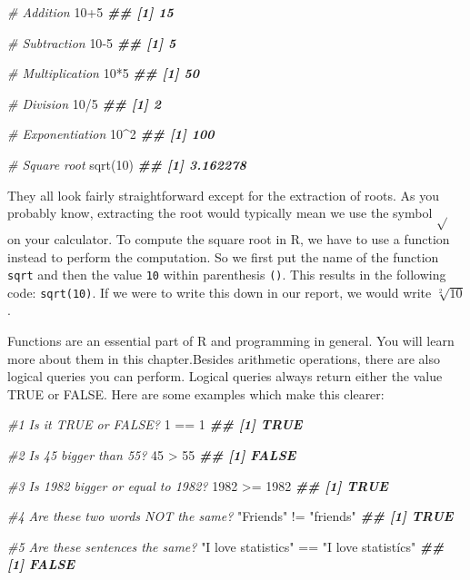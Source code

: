 \documentclass[
]{book}
\newenvironment{Shaded}{\begin{snugshade}}{\end{snugshade}}
\newcommand{\CommentTok}[1]{\textcolor[rgb]{0.56,0.35,0.01}{\textit{#1}}}
\newcommand{\DecValTok}[1]{\textcolor[rgb]{0.00,0.00,0.81}{#1}}
\newcommand{\DocumentationTok}[1]{\textcolor[rgb]{0.56,0.35,0.01}{\textbf{\textit{#1}}}}
\newcommand{\FunctionTok}[1]{\textcolor[rgb]{0.00,0.00,0.00}{#1}}
\newcommand{\NormalTok}[1]{#1}
\newcommand{\SpecialCharTok}[1]{\textcolor[rgb]{0.00,0.00,0.00}{#1}}
\newcommand{\StringTok}[1]{\textcolor[rgb]{0.31,0.60,0.02}{#1}}
\begin{document}
\begin{Shaded}
\begin{Highlighting}[]
\CommentTok{\# Addition}
\DecValTok{10}\SpecialCharTok{+}\DecValTok{5}
\DocumentationTok{\#\# [1] 15}

\CommentTok{\# Subtraction}
\DecValTok{10{-}5}
\DocumentationTok{\#\# [1] 5}

\CommentTok{\# Multiplication}
\DecValTok{10}\SpecialCharTok{*}\DecValTok{5}
\DocumentationTok{\#\# [1] 50}

\CommentTok{\# Division}
\DecValTok{10}\SpecialCharTok{/}\DecValTok{5}
\DocumentationTok{\#\# [1] 2}

\CommentTok{\# Exponentiation}
\DecValTok{10}\SpecialCharTok{\^{}}\DecValTok{2}
\DocumentationTok{\#\# [1] 100}

\CommentTok{\# Square root}
\FunctionTok{sqrt}\NormalTok{(}\DecValTok{10}\NormalTok{)}
\DocumentationTok{\#\# [1] 3.162278}
\end{Highlighting}
\end{Shaded}

They all look fairly straightforward except for the extraction of roots. As you probably know, extracting the root would typically mean we use the symbol \(\sqrt{}\) on your calculator. To compute the square root in R, we have to use a function instead to perform the computation. So we first put the name of the function \texttt{sqrt} and then the value \texttt{10} within parenthesis \texttt{()}. This results in the following code: \texttt{sqrt(10)}. If we were to write this down in our report, we would write \(\sqrt[2]{10}\).

Functions are an essential part of R and programming in general. You will learn more about them in this chapter.Besides arithmetic operations, there are also logical queries you can perform. Logical queries always return either the value TRUE or FALSE. Here are some examples which make this clearer:

\begin{Shaded}
\begin{Highlighting}[]

\CommentTok{\#1 Is it TRUE or FALSE?}
\DecValTok{1} \SpecialCharTok{==} \DecValTok{1}
\DocumentationTok{\#\# [1] TRUE}

\CommentTok{\#2 Is 45 bigger than 55?}
\DecValTok{45} \SpecialCharTok{\textgreater{}} \DecValTok{55}
\DocumentationTok{\#\# [1] FALSE}

\CommentTok{\#3 Is 1982 bigger or equal to 1982?}
\DecValTok{1982} \SpecialCharTok{\textgreater{}=} \DecValTok{1982}
\DocumentationTok{\#\# [1] TRUE}

\CommentTok{\#4 Are these two words NOT the same?}
\StringTok{"Friends"} \SpecialCharTok{!=} \StringTok{"friends"}
\DocumentationTok{\#\# [1] TRUE}

\CommentTok{\#5 Are these sentences the same?}
\StringTok{"I love statistics"} \SpecialCharTok{==} \StringTok{"I love statistícs"}
\DocumentationTok{\#\# [1] FALSE}
\end{Highlighting}
\end{Shaded}
\end{document}
